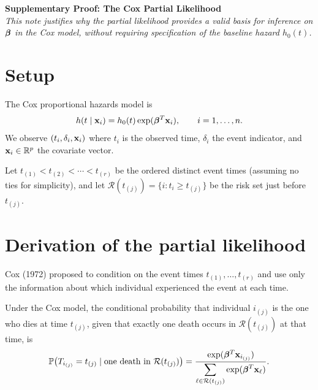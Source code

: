 



\moduleheader
\textbf{Supplementary Proof: The Cox Partial Likelihood}\\[6pt]
\textit{This note justifies why the partial likelihood provides a valid basis for inference on $\boldsymbol{\beta}$ in the Cox model, without requiring specification of the baseline hazard $h_0(t)$.}

\bigskip

\section*{Setup}

The Cox proportional hazards model is
\[
h(t \mid \mathbf{x}_i) = h_0(t) \exp(\boldsymbol{\beta}^T \mathbf{x}_i), \qquad i = 1, \ldots, n.
\]
We observe $(t_i, \delta_i, \mathbf{x}_i)$ where $t_i$ is the observed time, $\delta_i$ the event indicator, and $\mathbf{x}_i \in \mathbb{R}^p$ the covariate vector.

Let $t_{(1)} < t_{(2)} < \cdots < t_{(r)}$ be the ordered distinct event times (assuming no ties for simplicity), and let $\mathcal{R}(t_{(j)}) = \{i : t_i \geq t_{(j)}\}$ be the risk set just before $t_{(j)}$.

\section*{Derivation of the partial likelihood}

Cox (1972) proposed to condition on the event times $t_{(1)}, \ldots, t_{(r)}$ and use only the information about which individual experienced the event at each time.

\begin{lemma}
Under the Cox model, the conditional probability that individual $i_{(j)}$ is the one who dies at time $t_{(j)}$, given that exactly one death occurs in $\mathcal{R}(t_{(j)})$ at that time, is
\[
\mathbb{P}\bigl(T_{i_{(j)}} = t_{(j)} \mid \text{one death in } \mathcal{R}(t_{(j)})\bigr)
= \frac{\exp(\boldsymbol{\beta}^T \mathbf{x}_{i_{(j)}})}{\displaystyle\sum_{\ell \in \mathcal{R}(t_{(j)})} \exp(\boldsymbol{\beta}^T \mathbf{x}_\ell)}.
\]
\end{lemma}


